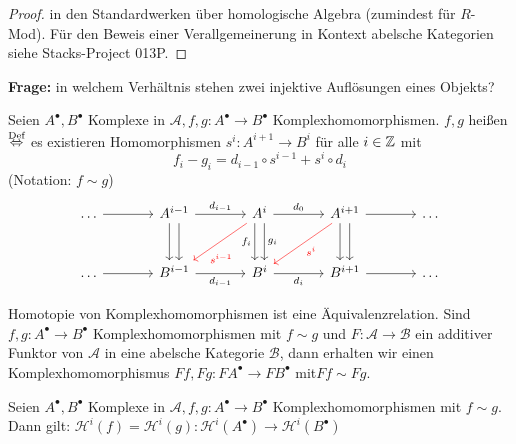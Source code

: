 \begin{proof}
	in den Standardwerken über homologische Algebra (zumindest für $R$-Mod). Für den Beweis einer Verallgemeinerung in Kontext abelsche Kategorien siehe Stacks-Project 013P.
\end{proof}
\textbf{Frage:} in welchem Verhältnis stehen zwei injektive Auflösungen eines Objekts? 
\begin{df}\label{7.10}
	Seien $A^{\bullet}, B^{\bullet} $ Komplexe in $\mathcal{A}, f,g: A^{\bullet} \to B^{\bullet} $ Komplexhomomorphismen. $f,g $ heißen  $\overset{\text{Def}}{\Leftrightarrow} $ es existieren Homomorphismen $ s^{i}: A^{i+1} \to B^i $ für alle $i \in \mathbb{Z} $ mit $$ f_i  -g_i = d_{i-1} \circ s^{i-1} + s^i \circ d_i $$
	(Notation: $f \sim g$)
	$$\begin{tikzcd}[column sep = large, row sep = large]
	\ldots \arrow{r} & A^{i-1}\arrow[xshift = -0.8 ex, swap]{d} \arrow[xshift = 0.8 ex]{d} \arrow{r}{d_{i-1}}& A^i \arrow[red, near end]{dl}{s^{i-1}} \arrow[xshift = -0.8 ex, swap]{d}{f_i} \arrow[xshift = 0.8ex]{d}{g_i} \arrow{r}{d_0} & A^{i+1} \arrow[red]{dl}{s^i} \arrow[xshift = -0.8 ex, swap]{d} \arrow[xshift = 0.8 ex]{d}\arrow{r} & \ldots\\
	\ldots \arrow{r} & B^{i-1} \arrow[swap]{r}{d_{i-1}} & B^i \arrow[swap]{r}{d_i} & B^{i+1} \arrow{r} & \ldots
	\end{tikzcd}$$
\end{df}
\begin{anm}
	Homotopie von Komplexhomomorphismen ist eine Äquivalenzrelation. Sind $f,g: A^{\bullet} \to B^{\bullet} $ Komplexhomomorphismen mit $ f \sim g $ und $F: \mathcal{A} \to \mathcal{B} $ ein additiver Funktor von $\mathcal{A} $ in eine abelsche Kategorie $\mathcal{B} $, dann erhalten wir einen Komplexhomomorphismus $ Ff, Fg: FA^{\bullet} \to FB^{\bullet} $ mit$ Ff \sim Fg$.
\end{anm}
\begin{bem}\label{7.8}
	Seien $A^{\bullet}, B^{\bullet} $ Komplexe in $\mathcal{A}, f,g: A^{\bullet} \to B^{\bullet} $ Komplexhomomorphismen mit $ f\sim g $. Dann gilt: $ \mathcal{H}^i(f) = \mathcal{H}^i(g): \mathcal{H}^i(A^{\bullet}) \to \mathcal{H}^i(B^{\bullet}) $
\end{bem}

